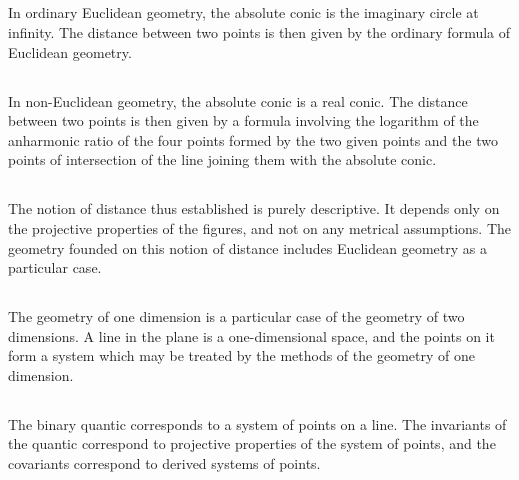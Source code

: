 \documentclass[12pt,a4paper]{article}
\begin{document}
\subsection{}

In ordinary Euclidean geometry, the absolute conic is the imaginary circle at infinity. The distance between two points is then given by the ordinary formula of Euclidean geometry.

\subsection{}

In non-Euclidean geometry, the absolute conic is a real conic. The distance between two points is then given by a formula involving the logarithm of the anharmonic ratio of the four points formed by the two given points and the two points of intersection of the line joining them with the absolute conic.

\subsection{}

The notion of distance thus established is purely descriptive. It depends only on the projective properties of the figures, and not on any metrical assumptions. The geometry founded on this notion of distance includes Euclidean geometry as a particular case.

\subsection{}

The geometry of one dimension is a particular case of the geometry of two dimensions. A line in the plane is a one-dimensional space, and the points on it form a system which may be treated by the methods of the geometry of one dimension.

\subsection{}

The binary quantic corresponds to a system of points on a line. The invariants of the quantic correspond to projective properties of the system of points, and the covariants correspond to derived systems of points.

\subsection{}
\end{document}
